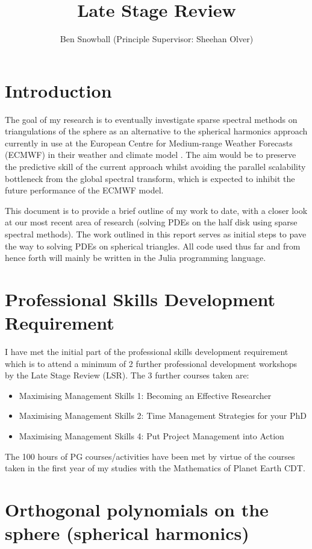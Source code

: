 \documentclass[11pt, oneside]{article}   	%
\title{Late Stage Review}
\author{Ben Snowball (Principle Supervisor: Sheehan Olver)}
\date{}							%
\begin{document}
\maketitle




\section{Introduction}

The goal of my research is to eventually investigate sparse spectral methods on triangulations of the sphere as an alternative to the spherical harmonics approach currently in use at the European Centre for Medium-range Weather Forecasts (ECMWF) in their weather and climate model \cite{wedi2013fast}. The aim would be to preserve the predictive skill of the current approach whilst avoiding the parallel scalability bottleneck from the global spectral transform, which is expected to inhibit the future performance of the ECMWF model.

This document is to provide a brief outline of my work to date, with a closer look at our most recent area of research (solving PDEs on the half disk using sparse spectral methods). The work outlined in this report serves as initial steps to pave the way to solving PDEs on spherical triangles. All code used thus far and from hence forth will mainly be written in the Julia programming language.

\section{Professional Skills Development Requirement}
I have met the initial part of the professional skills development requirement which is to attend a minimum of 2 further professional development workshops by the Late Stage Review (LSR). The 3 further courses taken are: 
\begin{itemize}
	\item Maximising Management Skills 1: Becoming an Effective Researcher
	\item Maximising Management Skills 2: Time Management Strategies for your PhD
	\item Maximising Management Skills 4: Put Project Management into Action
\end{itemize}
The 100 hours of PG courses/activities have been met by virtue of the courses taken in the first year of my studies with the Mathematics of Planet Earth CDT.


\section{Orthogonal polynomials on the sphere (spherical harmonics)}
\end{document}
